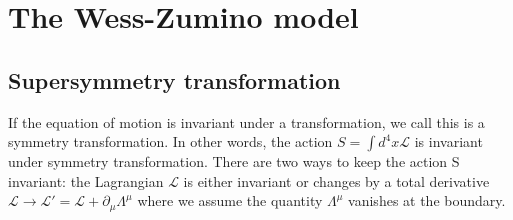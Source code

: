 \documentclass[12pt]{report}
\begin{document}





\chapter{The Wess-Zumino model}


\section{Supersymmetry transformation}
If the equation of motion is invariant under a transformation, we call this is a symmetry transformation.
In other words, the action $S = \int d^{4}x \mathcal{L}$ is invariant under symmetry transformation.
There are two ways to keep the action S invariant: the Lagrangian $\mathcal{L}$ is either invariant or changes by a total derivative $\mathcal{L} \to \mathcal{L}' = \mathcal{L} + \partial_{\mu} \Lambda^{\mu}$ where we assume the quantity $\Lambda^{\mu}$ vanishes at the boundary.
\end{document}
